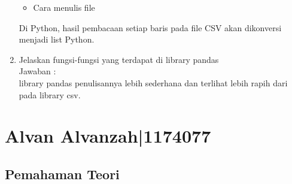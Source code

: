 \begin{enumerate}
\begin{itemize}
\item Cara menulis file
\end{itemize}
Di Python, hasil pembacaan setiap baris pada file CSV akan dikonversi menjadi list Python.

\item Jelaskan  fungsi-fungsi yang terdapat di library pandas\\
Jawaban :\\
library pandas penulisannya lebih sederhana dan terlihat lebih rapih dari pada library csv.

\end{enumerate}

\section{Alvan Alvanzah|1174077}
\subsection{Pemahaman Teori}


